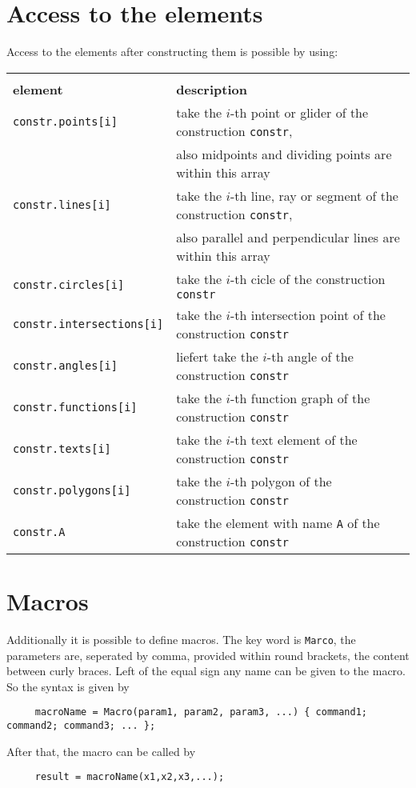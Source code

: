 \documentclass[10pt]{article}
\begin{document}
\section{Access to the elements}
Access to the elements after constructing them is possible by using: \\
\begin{tabular}
{|l|l|} \hline \\[-0.75em] {\large
\textbf{element}} & {\large \textbf{description}} \\ \hline\hline
\verb+constr.points[i]+ & take the $i$-th point or glider of the
construction \verb+constr+, \\ & also midpoints and dividing points are within this array \\
\hline\verb+constr.lines[i]+ & take the $i$-th line, ray or
segment of the construction \verb+constr+, \\ & also parallel and
perpendicular lines are within this array
\\
\hline\verb+constr.circles[i]+ & take the $i$-th cicle of the
construction \verb+constr+
\\
\hline\verb+constr.intersections[i]+ & take the $i$-th
intersection point of the construction \verb+constr+
\\
\hline\verb+constr.angles[i]+ & liefert take the $i$-th angle of
the construction \verb+constr+
\\
\hline\verb+constr.functions[i]+ & take the $i$-th function graph
of the construction \verb+constr+
\\
\hline\verb+constr.texts[i]+ & take the $i$-th text element of the
construction \verb+constr+
\\
\hline\verb+constr.polygons[i]+ & take the $i$-th polygon of the
construction \verb+constr+
\\
\hline\verb+constr.A+ & take the element with name \verb'A' of the
construction \verb+constr+
\\ \hline
\end{tabular}

\section{Macros}
Additionally it is possible to define macros. The key word is
\verb+Marco+, the parameters are, seperated by comma, provided
within round brackets, the content between curly braces. Left of
the equal sign any name can be given to the macro. \\ So the
syntax is given by
\begin{verbatim}
     macroName = Macro(param1, param2, param3, ...) { command1; command2; command3; ... };
\end{verbatim}
After that, the macro can be called by
\begin{verbatim}
     result = macroName(x1,x2,x3,...);
\end{verbatim}
\end{document}
